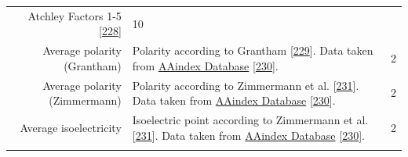 \documentclass[11pt,a4paper,twoside]{book}
\theoremstyle{definition}
\theoremstyle{definition}
\theoremstyle{remark}
\begin{document}
\begin{longtable}[]{@{}rlc@{}}
\begin{minipage}[t]{0.50\columnwidth}
Atchley Factors 1-5 {[}\protect\hyperlink{ref-Atchley2005}{228}{]}\strut
\end{minipage} & \begin{minipage}[t]{0.18\columnwidth}\centering\strut
10\strut
\end{minipage}\tabularnewline
\begin{minipage}[t]{0.23\columnwidth}\raggedleft\strut
Average polarity (Grantham)\strut
\end{minipage} & \begin{minipage}[t]{0.50\columnwidth}\raggedright\strut
Polarity according to Grantham
{[}\protect\hyperlink{ref-Grantham1974}{229}{]}. Data taken from
\href{http://www.genome.jp/dbget-bin/www_bget?aaindex:GRAR740102}{AAindex
Database} {[}\protect\hyperlink{ref-Kawashima2008}{230}{]}.\strut
\end{minipage} & \begin{minipage}[t]{0.18\columnwidth}\centering\strut
2\strut
\end{minipage}\tabularnewline
\begin{minipage}[t]{0.23\columnwidth}\raggedleft\strut
Average polarity (Zimmermann)\strut
\end{minipage} & \begin{minipage}[t]{0.50\columnwidth}\raggedright\strut
Polarity according to Zimmermann et al.
{[}\protect\hyperlink{ref-Zimmerman1968}{231}{]}. Data taken from
\href{http://www.genome.jp/dbget-bin/www_bget?aaindex:ZIMJ680103}{AAindex
Database} {[}\protect\hyperlink{ref-Kawashima2008}{230}{]}.\strut
\end{minipage} & \begin{minipage}[t]{0.18\columnwidth}\centering\strut
2\strut
\end{minipage}\tabularnewline
\begin{minipage}[t]{0.23\columnwidth}\raggedleft\strut
Average isoelectricity\strut
\end{minipage} & \begin{minipage}[t]{0.50\columnwidth}\raggedright\strut
Isoelectric point according to Zimmermann et al.
{[}\protect\hyperlink{ref-Zimmerman1968}{231}{]}. Data taken from
\href{http://www.genome.jp/dbget-bin/www_bget?aaindex:ZIMJ680104}{AAindex
Database} {[}\protect\hyperlink{ref-Kawashima2008}{230}{]}.\strut
\end{minipage} & \begin{minipage}[t]{0.18\columnwidth}\centering\strut
2\strut
\end{minipage}\tabularnewline
\begin{minipage}[t]{0.23\columnwidth}\raggedleft\strut

\end{minipage}
\end{longtable}
\end{document}
